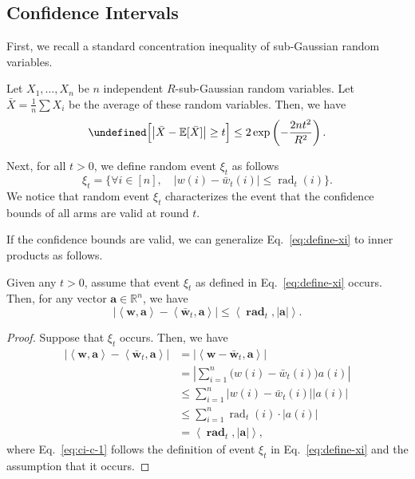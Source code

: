 \documentclass{article}
\newcommand{\RR}{\mathbb R}
\DeclareMathOperator{\rad}{rad}
\let\Pr\undefined
\DeclareMathOperator{\Pr}{Pr}
\newcommand{\inn}[1]{\left\langle #1 \right\rangle}
\renewcommand{\vec}[1]{\boldsymbol{#1}}
\begin{document}
\subsection{Confidence Intervals}

First, we recall a standard concentration inequality of sub-Gaussian random variables.
\begin{lemma}
\label{lemma:hoeffeding}
Let $X_1,\ldots, X_n$ be $n$ independent $R$-sub-Gaussian random variables. 
Let $\bar X=\frac{1}{n}\sum X_i$ be the average of these random variables.
Then, we have
$$
\Pr\Big[ \big|\bar X - \mathbb E[\bar X] \big| \ge t \Big] \le 
2\exp\left(-\frac{2nt^2}{R^2}\right).
$$
\end{lemma}


Next, for all $t>0$, we define random event $\xi_t$ as follows
\begin{equation}
\xi_t = \Big\{
\forall i\in[n],\quad 
|w(i)-\bar w_t(i)| \le \rad_t(i) 
\Big\}.
\label{eq:define-xi}
\end{equation}
We notice that random event $\xi_t$ characterizes the event that the confidence bounds of all arms are valid at round $t$.

If the confidence bounds are valid, we can generalize Eq.~\eqref{eq:define-xi} to inner products as follows.
\begin{lemma}
\label{lemma:ci-property}
Given any $t>0$, assume that event $\xi_t$ as defined in Eq.~\eqref{eq:define-xi} occurs. 
Then, for any vector $\vec a \in \RR^n$, we have
$$
\big|\inn{\vec w,\vec a} - \inn{\vec {\bar w}_t, \vec a}\big| \le \inn{\vec \rad_t, |\vec a|}.
$$
\end{lemma}

\begin{proof}
Suppose that $\xi_t$ occurs. Then, we have
\begin{align}
\big|\inn{\vec w,\vec a} - \inn{\vec {\bar w}_t, \vec a}\big| 
&=\big|\inn{\vec w-\vec {\bar w}_t,\vec a}\big| \nonumber \\
&=\left|\sum_{i=1}^n \big(w(i)-\bar w_t(i)\big) a(i)  \right| \nonumber \\
&\le\sum_{i=1}^n \big| w(i)-\bar w_t(i)\big| |a(i)| \nonumber \\
&\le\sum_{i=1}^{n} \rad_t(i) \cdot |a(i)| \label{eq:ci-c-1}\\
&= \inn{\vec \rad_t,  |\vec a|}, \nonumber
\end{align}
where Eq.~\eqref{eq:ci-c-1} follows the definition of event $\xi_t$ in Eq.~\eqref{eq:define-xi} and the assumption that it occurs.
\end{proof}
\end{document}
